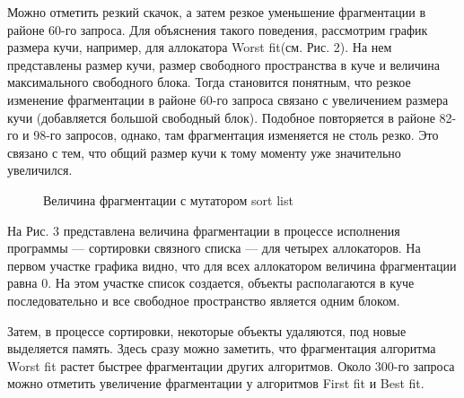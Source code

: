    Можно отметить резкий скачок, а затем резкое уменьшение фрагментации в районе 60-го запроса. Для объяснения такого поведения, рассмотрим график размера кучи, 
   например, для аллокатора Worst fit(см. Рис. 2). На нем представлены размер кучи, размер свободного пространства в куче и величина максимального свободного
   блока.
   Тогда становится понятным, что резкое изменение фрагментации в районе 60-го запроса связано с увеличением размера кучи (добавляется большой свободный блок). 
   Подобное повторяется в районе 82-го и 98-го запросов, однако, там фрагментация изменяется не столь резко. Это связано с тем, что общий размер кучи к тому моменту
   уже значительно увеличился.
   
   
   \begin{figure}[p]
   \caption{Величина фрагментации с мутатором sort list}
   \label{ris:image}
   \end{figure}
   
   На Рис. 3 представлена величина фрагментации в процессе исполнения программы --- сортировки связного списка --- для четырех аллокаторов. На первом участке графика
   видно, что для всех аллокатором величина фрагментации равна 0. На этом участке список создается, объекты располагаются в куче последовательно и все свободное
   пространство является одним блоком. 
   
   Затем, в процессе сортировки, некоторые объекты удаляются, под новые выделяется память. Здесь сразу можно заметить, что фрагментация алгоритма Worst fit растет
   быстрее фрагментации других алгоритмов. Около 300-го запроса можно отметить увеличение фрагментации у алгоритмов First fit и Best fit. 
   
